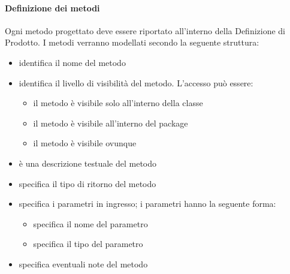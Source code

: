 \paragraph{Definizione dei metodi}
Ogni metodo progettato deve essere riportato all'interno della Definizione di Prodotto. I metodi verranno modellati secondo la seguente struttura:
\begin{itemize}
\item {}identifica il nome del metodo
\item {}identifica il livello di visibilità del metodo. L'accesso può essere:
	\begin{itemize}
	\item {}il metodo è visibile solo all'interno della classe
	\item {}il metodo è visibile all'interno del package
	\item {}il metodo è visibile ovunque
	\end{itemize}
\item {}è una descrizione testuale del metodo
\item {}specifica il tipo di ritorno del metodo
\item {}specifica i parametri in ingresso; i parametri hanno la seguente forma:
	\begin{itemize}
	\item {}specifica il nome del parametro
	\item {}specifica il tipo del parametro
	\end{itemize}
\item {}specifica eventuali note del metodo
\end{itemize}

